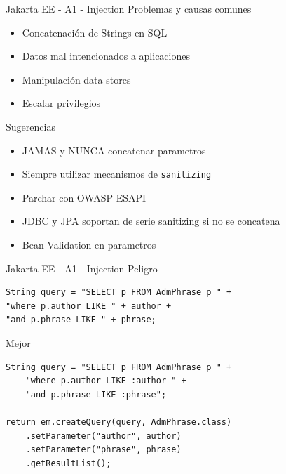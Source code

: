 \documentclass[aspectratio=169]{beamer}
\begin{document}
\begin{frame}{Jakarta EE - A1 - Injection}
    Problemas y causas comunes
    \begin{itemize}
        \item Concatenación de Strings en SQL
        \item Datos mal intencionados a aplicaciones
        \item Manipulación data stores
        \item Escalar privilegios
    \end{itemize}

    Sugerencias
    \begin{itemize}
        \item JAMAS y NUNCA concatenar parametros
        \item Siempre utilizar mecanismos de \texttt{sanitizing}
        \item Parchar con OWASP ESAPI
        \item JDBC y JPA soportan de serie sanitizing si no se concatena
        \item Bean Validation en parametros
    \end{itemize}
\end{frame}


\begin{frame}[fragile]{Jakarta EE - A1 - Injection}
Peligro
\begin{lstlisting}
String query = "SELECT p FROM AdmPhrase p " +
"where p.author LIKE " + author +
"and p.phrase LIKE " + phrase;

\end{lstlisting}

Mejor
\begin{lstlisting}[basicstyle=\scriptsize]
String query = "SELECT p FROM AdmPhrase p " +
    "where p.author LIKE :author " +
    "and p.phrase LIKE :phrase";

return em.createQuery(query, AdmPhrase.class)
    .setParameter("author", author)
    .setParameter("phrase", phrase)
    .getResultList();
\end{lstlisting}
\end{frame}
\end{document}
